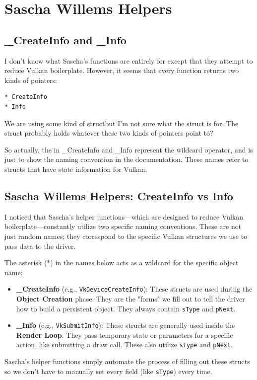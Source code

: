 \documentclass{article}
\begin{document}

\section*{Sascha Willems Helpers}
\subsection*{\_CreateInfo and \_Info}
I don't know what Sascha's functions are entirely for\textemdash
except that they attempt to reduce Vulkan boilerplate. However, it
seems that every function returns two kinds of pointers:
\begin{verbatim}
*_CreateInfo
*_Info
\end{verbatim}
\par We are using some kind of struct\textemdash but I'm not sure what the
struct is for. The struct probably holds whatever these two kinds of
pointers point to?

\par So actually, the \* in \*\_CreateInfo and
\*\_Info represent the wildcard operator, and is just to show
the naming convention in the documentation. These names refer to
structs that have state information for Vulkan.

\subsection*{Sascha Willems Helpers: CreateInfo vs Info}
I noticed that Sascha’s helper functions—which are designed to reduce
Vulkan boilerplate—constantly utilize two specific naming
conventions. These are not just random names; they correspond to the
specific Vulkan structures we use to pass data to the driver.

The asterisk (*) in the names below acts as a wildcard for the
specific object name:
\begin{itemize}
  \item \textbf{\_CreateInfo} (e.g., \texttt{VkDeviceCreateInfo}):
    These structs are used during the \textbf{Object Creation} phase.
    They are the "forms" we fill out to tell the driver how to build
    a persistent object. They always contain \texttt{sType} and \texttt{pNext}.
  \item \textbf{\_Info} (e.g., \texttt{VkSubmitInfo}): These structs
    are generally used inside the \textbf{Render Loop}. They pass
    temporary state or parameters for a specific action, like
    submitting a draw call. These also utilize \texttt{sType} and
    \texttt{pNext}.
\end{itemize}
Sascha's helper functions simply automate the process of filling out
these structs so we don't have to manually set every field (like
\texttt{sType}) every time.
\end{document}
